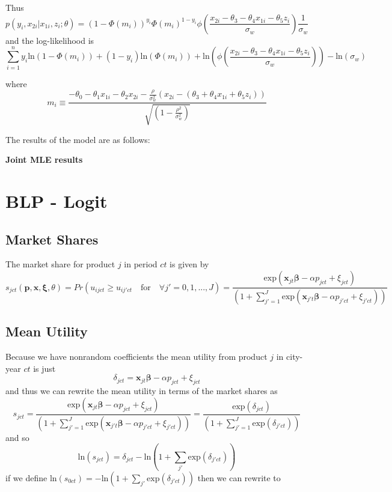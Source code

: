 \documentclass[11pt]{article}
\begin{document}
Thus 
$$p(y_i,  x_{2i} | x_{1i}, z_i; \theta) = (1-\Phi(m_i))^{y_i}\Phi(m_i)^{1-y_i}\phi(\frac{x_{2i} - \theta_3  - \theta_4 x_{1i} - \theta_5z_i}{\sigma_w})\frac{1}{\sigma_w}$$
and the log-likelihood is
$$\sum_{i=1}^n y_i \text{ln}(1-\Phi(m_i)) + (1-y_i)\text{ln}(\Phi(m_i))  + \text{ln}(\phi(\frac{x_{2i} - \theta_3  - \theta_4 x_{1i} - \theta_5z_i}{\sigma_w})) - \text{ln}(\sigma_w) $$

where $$m_i \equiv \frac{-\theta_0 - \theta_1 x_{1i} - \theta_2 x_{2i} - \frac{\rho}{\sigma_{w}^2}(x_{2i} - (\theta_3 + \theta_4 x_{1i} + \theta_5z_i))}{\sqrt{ (1- \frac{\rho^2}{\sigma_w^2})}}$$

The results of the model are as follows:
\begin{center}
	\centering
	\textbf{Joint MLE results}\par\medskip
	\scalebox{1}{
		
	}
\end{center}


\section{BLP - Logit}
\subsection{Market Shares}
The market share for product $j$ in period $ct$ is given by 
$$s_{jct}(\bm{p}, \bm{x}, \bm{\xi}, \theta) = Pr(u_{ijct} \ge u_{ij'ct} \quad \text{for} \quad  \forall j' = 0, 1, ... , J) = \frac{\text{exp}(\bm{x}_{jt}\bm{\beta} - \alpha p_{jct} + \xi_{jct})}{(1+\sum_{j'= 1}^{J}\text{exp}(\bm{x}_{j't}\bm{\beta} - \alpha p_{j'ct} + \xi_{j'ct}))}$$ 
\subsection{Mean Utility}
Because we have nonrandom coefficients the mean utility from product $j$ in city-year $ct$ is just $$\delta_{jct} = \bm{x}_{jt}\bm{\beta} - \alpha p_{jct} + \xi_{jct}$$
and thus we can rewrite the mean utility in terms of the market shares as 
$$s_{jct} =  \frac{\text{exp}(\bm{x}_{jt}\bm{\beta} - \alpha p_{jct} + \xi_{jct})}{(1+\sum_{j'= 1}^{J}\text{exp}(\bm{x}_{j't}\bm{\beta} - \alpha p_{j'ct} + \xi_{j'ct}))} = \frac{\text{exp}(\delta_{jct})}{(1+\sum_{j'= 1}^{J}\text{exp}(\delta_{j'ct}))}$$ 
and so
$$\text{ln}(s_{jct}) = \delta_{jct} - \text{ln}(1 + \sum_{j'}\text{exp}(\delta_{j'ct}))$$
if we define $\text{ln}(s_{0ct}) = - \text{ln}(1 + \sum_{j'}\text{exp}(\delta_{j'ct}))$ then we can rewrite to 
\end{document}
